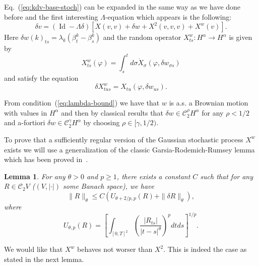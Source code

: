 \documentclass[a4paper,11pt,reqno]{article}
\newcommand{\der}{\delta}
\newcommand{\CC}{\mathcal{C}}
\DeclareMathOperator{\id}{\text{Id}}
\newtheorem{lemma}[theorem]{Lemma}
\begin{document}
Eq.~(\ref{eq:kdv-base-stoch}) can be expanded in the same
way as we have done before and the first
interesting $\Lambda$-equation which appears is the following:
\begin{equation}
  \label{eq:lambda-eq-stoch}
  \der v = (\id-\Lambda\der)[X(v,v) + \der w + X^{2}(v,v,v) + X^{w}(v)].
\end{equation}
Here $\der w(k)_{ts} = \lambda_k (\beta^k_t-\beta^k_s)$ and  the
random operator $X^w_{ts}: H^\alpha\to H^\alpha$ is given by
\begin{equation}
  \label{eq:Xw}
  X^w_{ts}(\varphi) = \int_s^t d\sigma \dot X_\sigma(\varphi, \der
  w_{\sigma s})
\end{equation}
and satisfy the equation
\begin{equation}
  \label{eq:deltaXw}
  \der X^w_{tus} = X_{tu}(\varphi,\der w_{us}).
\end{equation}

From condition~(\ref{eq:lambda-bound}) we have that $w$ is a.s. a Brownian
motion with values in $H^{\alpha}$ and then by classical results that $\der w \in
\CC^{\rho}_2 H^\alpha$ for any $\rho < 1/2$ and a-fortiori $\der w \in
\CC^{\gamma}_2 H^\alpha$ by choosing $\rho \in [\gamma,1/2)$. 

To prove that a sufficiently regular version of the Gaussian stochastic process $X^w$ exists
we will use a generalization of the classic Garsia-Rodemich-Rumsey lemma
which has been proved in~\cite{MR2091358}.
\begin{lemma}
\label{lemma:besov}
For any $\theta > 0$ and $p \ge 1$,  there exists a constant
$C$ such that for any $R \in \CC_{2} V$ ($(V,|\cdot|)$ some Banach space), we have 
\begin{equation}
\label{eq:generalboundxx}
\|R\|_{\theta} \le C (U_{\theta+2/p,p}(R)+\|\der R\|_{\theta}),
\end{equation}
where
\begin{equation*}
 U_{\theta,p}(R) = \left[ \int_{[0,T]^2}
 \left(\frac{|R_{t s}|}{|t-s|^\theta}\right)^p dt ds \right]^{1/p}.
\end{equation*}
\end{lemma}

We would like that $X^w$ behaves not worser than $X^2$. 
This is indeed the case as stated in the next lemma.
\end{document}
